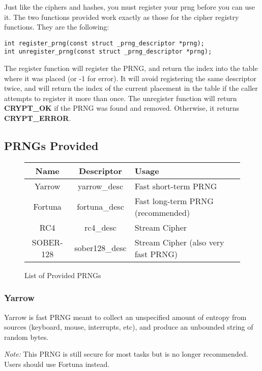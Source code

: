 \documentclass[synpaper]{book}
\begin{document}
Just like the ciphers and hashes, you must register your prng before you can use it.  The two functions provided work exactly as those for the cipher registry functions.
They are the following:
 
\begin{verbatim}
int register_prng(const struct _prng_descriptor *prng);
int unregister_prng(const struct _prng_descriptor *prng);
\end{verbatim}

The register function will register the PRNG, and return the index into the table where it was placed (or -1 for error).  It will avoid registering the same
descriptor twice, and will return the index of the current placement in the table if the caller attempts to register it more than once.  The unregister function
will return \textbf{CRYPT\_OK} if the PRNG was found and removed.  Otherwise, it returns \textbf{CRYPT\_ERROR}.

\subsection{PRNGs Provided}
\begin{figure}[here]
\begin{center}
\begin{small}
\begin{tabular}{|c|c|l|}
\hline \textbf{Name} & \textbf{Descriptor} & \textbf{Usage} \\
\hline Yarrow & yarrow\_desc & Fast short-term PRNG \\
\hline Fortuna & fortuna\_desc & Fast long-term PRNG (recommended) \\
\hline RC4 & rc4\_desc & Stream Cipher \\
\hline SOBER-128 & sober128\_desc & Stream Cipher (also very fast PRNG) \\
\hline
\end{tabular}
\end{small}
\end{center}
\caption{List of Provided PRNGs}
\end{figure}

\subsubsection{Yarrow}
Yarrow is fast PRNG meant to collect an unspecified amount of entropy from sources
(keyboard, mouse, interrupts, etc), and produce an unbounded string of random bytes.

\textit{Note:} This PRNG is still secure for most tasks but is no longer recommended.  Users
should use Fortuna instead.
\end{document}
